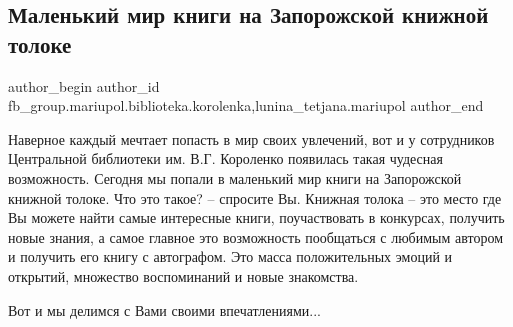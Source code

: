  
 
 
 
 

\subsection{Маленький мир книги на Запорожской книжной толоке}
\label{sec:27_10_2018.fb.fb_group.mariupol.biblioteka.korolenka.1.malenkii_mir_knigi_n}
 
\ifcmt
 author_begin
   author_id fb_group.mariupol.biblioteka.korolenka,lunina_tetjana.mariupol
 author_end
\fi

Наверное каждый мечтает попасть в мир своих увлечений, вот и у сотрудников
Центральной библиотеки им. В.Г. Короленко появилась такая чудесная возможность.
Сегодня мы попали в маленький мир книги на Запорожской книжной толоке. Что это
такое? – спросите Вы.  Книжная толока – это место где Вы можете найти самые
интересные книги, поучаствовать в конкурсах, получить новые знания, а самое
главное это возможность пообщаться с любимым автором и получить его книгу с
автографом. Это масса положительных эмоций и открытий, множество воспоминаний и
новые знакомства. 

Вот и мы делимся с Вами своими впечатлениями...
